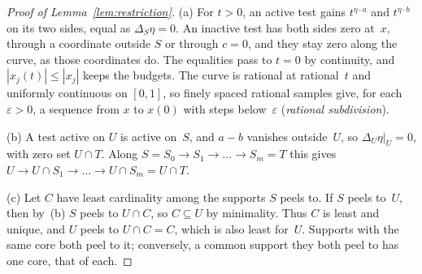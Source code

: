 \begin{proof}[Proof of Lemma~\ref{lem:restriction}]
(a) For $t>0$, an active test gains $t^{\eta\cdot a}$ and
$t^{\eta\cdot b}$ on its two sides, equal as $\Delta_S\eta=0$. An inactive
test has both sides zero at~$x$, through a coordinate outside $S$ or
through $c=0$, and they stay zero along the curve, as those coordinates
do. The equalities pass to $t=0$ by continuity, and $|x_j(t)|\le|x_j|$
keeps the budgets. The curve is rational at rational~$t$ and uniformly
continuous on $[0,1]$, so finely spaced rational samples give, for each
$\varepsilon>0$, a sequence from $x$ to $x(0)$ with steps
below~$\varepsilon$ (\emph{rational subdivision}).

(b) A test active on $U$ is active on~$S$, and $a-b$ vanishes outside~$U$,
so $\Delta_U\eta|_U=0$, with zero set $U\cap T$. Along
$S=S_0\to S_1\to\dots\to S_m=T$ this gives
$U\to U\cap S_1\to\dots\to U\cap S_m=U\cap T$.

(c) Let $C$ have least cardinality among the supports $S$ peels to. If $S$
peels to~$U$, then by~(b) $S$ peels to $U\cap C$, so $C\subseteq U$ by
minimality. Thus $C$ is least and unique, and $U$ peels to $U\cap C=C$,
which is also least for~$U$. Supports with the same core both peel to it;
conversely, a common support they both peel to has one core, that of each.
\end{proof}

